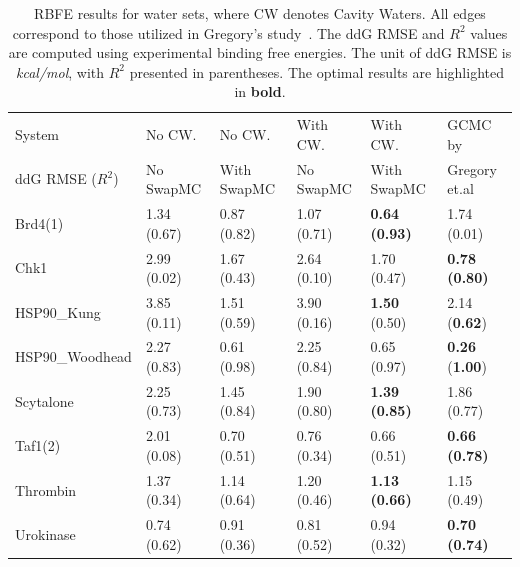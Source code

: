 \documentclass[journal=jacsat,manuscript=article]{achemso}
\begin{document}
\begin{table}
  \caption{RBFE results for water sets, where CW denotes Cavity Waters. All edges correspond to those utilized in Gregory's study~\cite{ross2020enhancing}. 
  The ddG RMSE and $R^2$ values are computed using experimental binding free energies. 
  The unit of ddG RMSE is \textit{kcal/mol}, with $R^2$ presented in parentheses. 
  The optimal results are highlighted in \textbf{bold}.}
  \label{tbl:rbfe_watersets}
  \begin{tabular}{l|lllll}
    \hline
    System                    & No CW.     & No CW.        & With CW.    & With CW.     & GCMC by  \\
    ddG RMSE ($R^2$)          & No SwapMC  & With SwapMC   & No SwapMC   & With SwapMC  & Gregory et.al~\cite{ross2020enhancing} \\
    \hline
    Brd4(1)                      & 1.34 (0.67) & 0.87 (0.82) & 1.07 (0.71) & \textbf{0.64 (0.93)} & 1.74 (0.01) \\
    Chk1                         & 2.99 (0.02) & 1.67 (0.43) & 2.64 (0.10) & 1.70 (0.47) & \textbf{0.78 (0.80)} \\
    HSP90\_Kung                  & 3.85 (0.11) & 1.51 (0.59) & 3.90 (0.16) & \textbf{1.50} (0.50) & 2.14 (\textbf{0.62}) \\
    HSP90\_Woodhead              & 2.27 (0.83) & 0.61 (0.98) & 2.25 (0.84) & 0.65 (0.97) & \textbf{0.26} (\textbf{1.00}) \\
    Scytalone                    & 2.25 (0.73) & 1.45 (0.84) & 1.90 (0.80) & \textbf{1.39 (0.85)} & 1.86 (0.77) \\
    Taf1(2)                      & 2.01 (0.08) & 0.70 (0.51) & 0.76 (0.34) & 0.66 (0.51) & \textbf{0.66 (0.78)} \\
    Thrombin                     & 1.37 (0.34) & 1.14 (0.64) & 1.20 (0.46) & \textbf{1.13 (0.66)} & 1.15 (0.49) \\
    Urokinase                    & 0.74 (0.62) & 0.91 (0.36) & 0.81 (0.52) & 0.94 (0.32) & \textbf{0.70 (0.74)} \\
    \hline
  \end{tabular}
\end{table}
\end{document}

